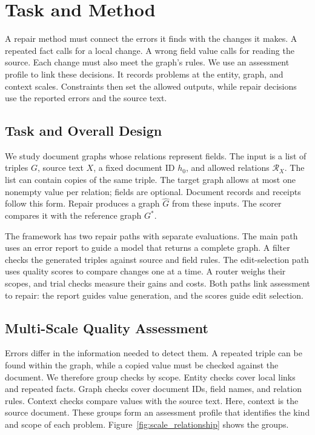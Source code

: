 \section{Task and Method}
\label{sec:framework}

A repair method must connect the errors it finds with the changes it makes.
A repeated fact calls for a local change. A wrong field value calls for
reading the source. Each change must also meet the graph's rules.
We use an assessment profile to link these decisions.
It records problems at the entity, graph, and context scales.
Constraints then set the allowed outputs, while repair decisions use
the reported errors and the source text.

\subsection{Task and Overall Design}
\label{sec:framework:problem}

We study document graphs whose relations represent fields.
The input is a list of triples $G$, source text $X$, a fixed document ID
$h_0$, and allowed relations $\mathcal R_X$.
The list can contain copies of the same triple.
The target graph allows at most one nonempty value per relation;
fields are optional. Document records and receipts follow this form.
Repair produces a graph $\widehat G$ from these inputs.
The scorer compares it with the reference graph $G^*$.

The framework has two repair paths with separate evaluations.
The main path uses an error report to guide a model that returns a complete
graph. A filter checks the generated triples against source and field rules.
The edit-selection path uses quality scores to compare changes one at a time.
A router weighs their scopes, and trial checks measure their gains and costs.
Both paths link assessment to repair: the report guides value generation,
and the scores guide edit selection.

\subsection{Multi-Scale Quality Assessment}
\label{sec:framework:profile}

Errors differ in the information needed to detect them.
A repeated triple can be found within the graph, while a copied value
must be checked against the document. We therefore group checks by scope.
Entity checks cover local links and repeated facts. Graph checks cover
document IDs, field names, and relation rules. Context checks compare
values with the source text. Here, context is the source document.
These groups form an assessment profile that identifies the kind and
scope of each problem. Figure~\ref{fig:scale_relationship} shows the groups.

